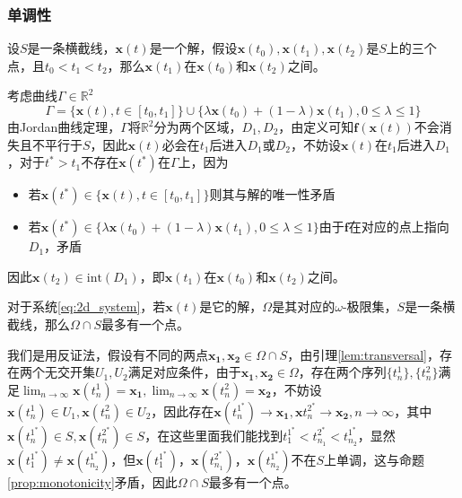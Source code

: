 \subsubsection{单调性}
\begin{prop}\label{prop:monotonicity}
    设$S$是一条横截线，$\mathbf{x}(t)$是一个解，假设$\mathbf{x}(t_0),\mathbf{x}(t_1),\mathbf{x}(t_2)$是$S$上的三个点，且$t_0<t_1<t_2$，那么$\mathbf{x}(t_1)$在$\mathbf{x}(t_0)$和$\mathbf{x}(t_2)$之间。
\end{prop}
\begin{pf}
    考虑曲线$\Gamma\in\mathbb{R}^2$
    \begin{equation}
        \Gamma=\{\mathbf{x}(t),t\in[t_0,t_1]\}\cup\{\lambda\mathbf{x}(t_0)+(1-\lambda)\mathbf{x}(t_1),0\leq \lambda\leq 1\}
    \end{equation}
    由Jordan曲线定理，$\Gamma$将$\mathbb{R}^2$分为两个区域，$D_1,D_2$，由定义可知$\mathbf{f}(\mathbf{x}(t))$不会消失且不平行于$S$，因此$\mathbf{x}(t)$必会在$t_1$后进入$D_1$或$D_2$，不妨设$\mathbf{x}(t)$在$t_1$后进入$D_1$，对于$t^*>t_1$不存在$\mathbf{x}(t^*)$在$\Gamma$上，因为
    \begin{itemize}
        \item 若$\mathbf{x}(t^*)\in \{\mathbf{x}(t),t\in[t_0,t_1]\}$则其与解的唯一性矛盾
        \item 若$\mathbf{x}(t^*)\in \{\lambda\mathbf{x}(t_0)+(1-\lambda)\mathbf{x}(t_1),0\leq \lambda\leq 1\}$由于$\mathbf{f}$在对应的点上指向$D_1$，矛盾
    \end{itemize}
    因此$\mathbf{x}(t_2)\in \text{int}(D_1)$，即$\mathbf{x}(t_1)$在$\mathbf{x}(t_0)$和$\mathbf{x}(t_2)$之间。
\end{pf}
\begin{prop}\label{prop:at_most_one_point}
    对于系统\ref{eq:2d_system}，若$\mathbf{x}(t)$是它的解，$\Omega$是其对应的$\omega$-极限集，$S$是一条横截线，那么$\Omega\cap S$最多有一个点。
\end{prop}
\begin{pf}
    我们是用反证法，假设有不同的两点$\mathbf{x_1},\mathbf{x_2}\in\Omega\cap S$，由引理\ref{lem:transversal}，存在两个无交开集$U_1,U_2$满足对应条件，由于$\mathbf{x_1},\mathbf{x_2}\in \Omega$，存在两个序列$\{t_n^1\},\{t_n^2\}$满足$\lim_{n\to\infty}\mathbf{x}(t_n^1)=\mathbf{x_1},
    \lim_{n\to\infty}\mathbf{x}(t_n^2)=\mathbf{x_2}$，不妨设$\mathbf{x}(t_n^1)\in U_1,\mathbf{x}(t_n^2)\in U_2$，因此存在$\mathbf{x}(t_n^{1^*})\to\mathbf{x_1}, \mathbf{x}{t_n^{{2^*}}}\to \mathbf{x_2},n\to\infty$，其中$\mathbf{x}(t_n^{1^*})\in S,\mathbf{x}(t_n^{{2^*}})\in S$，在这些里面我们能找到$t_{1}^{1^*}<t_{n_1}^{{2^*}}<t_{n_2}^{1^*}$，显然$\mathbf{x}(t_1^{1^*})\neq \mathbf{x}(t_{n_2}^{1^*})$，但$\mathbf{x}(t_1^{1^*})，\mathbf{x}(t_{n_1}^{{2^*}})，\mathbf{x}(t_{n_2}^{1^*})$不在$S$上单调，这与命题\ref{prop:monotonicity}矛盾，因此$\Omega\cap S$最多有一个点。
\end{pf}
